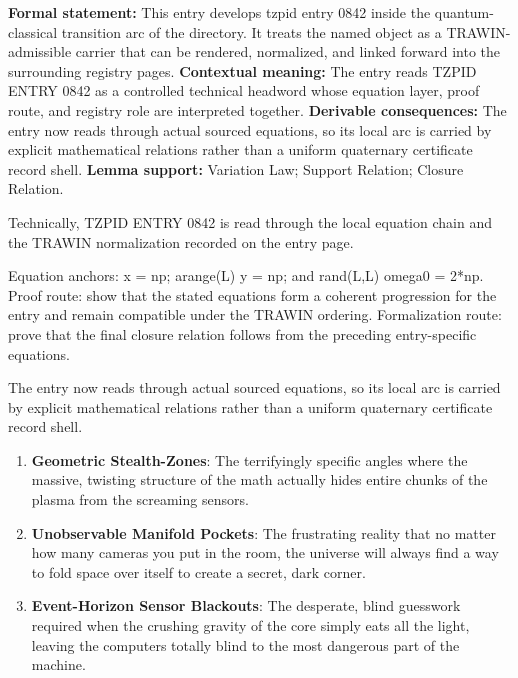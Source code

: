 \begingroup\footnotesize\setlength{\emergencystretch}{3em}\sloppy
\textbf{Formal statement:} This entry develops tzpid entry 0842 inside the quantum-classical transition arc of the directory. It treats the named object as a TRAWIN-admissible carrier that can be rendered, normalized, and linked forward into the surrounding registry pages. \textbf{Contextual meaning:} The entry reads TZPID ENTRY 0842 as a controlled technical headword whose equation layer, proof route, and registry role are interpreted together. \textbf{Derivable consequences:} The entry now reads through actual sourced equations, so its local arc is carried by explicit mathematical relations rather than a uniform quaternary certificate record shell. \textbf{Lemma support:} Variation Law; Support Relation; Closure Relation.\par
\endgroup

Technically, TZPID ENTRY 0842 is read through the local equation chain and the TRAWIN normalization recorded on the entry page.

Equation anchors: x = np; arange(L) y = np; and rand(L,L) omega0 = 2*np. Proof route: show that the stated equations form a coherent progression for the entry and remain compatible under the TRAWIN ordering. Formalization route: prove that the final closure relation follows from the preceding entry-specific equations.

The entry now reads through actual sourced equations, so its local arc is carried by explicit mathematical relations rather than a uniform quaternary certificate record shell.
\endgroup

\begin{enumerate}[leftmargin=1.6em,itemsep=6pt,topsep=4pt]
\item \textbf{Geometric Stealth-Zones}: The terrifyingly specific angles where the massive, twisting structure of the math actually hides entire chunks of the plasma from the screaming sensors.
\item \textbf{Unobservable Manifold Pockets}: The frustrating reality that no matter how many cameras you put in the room, the universe will always find a way to fold space over itself to create a secret, dark corner.
\item \textbf{Event-Horizon Sensor Blackouts}: The desperate, blind guesswork required when the crushing gravity of the core simply eats all the light, leaving the computers totally blind to the most dangerous part of the machine.
\end{enumerate}


